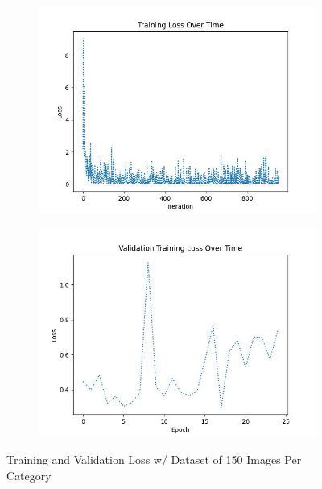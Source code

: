 \documentclass{article}
\begin{document}
\begin{figure}[H]
    \centering
    \begin{subfigure}{0.4\textwidth}
        \centering
        \includegraphics[width = \textwidth]{imgs/loss/loss_plot_150.jpg}
    \end{subfigure}
    \begin{subfigure}{0.4\textwidth}
        \centering
        \includegraphics[width = \textwidth]{imgs/loss/validation_loss_plot_150.jpg}
    \end{subfigure}
    \caption{Training and Validation Loss w/ Dataset of 150 Images Per Category}
\end{figure}
\end{document}
